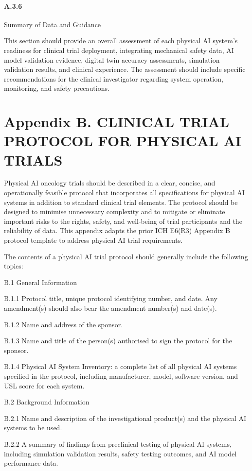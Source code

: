 \documentclass[11pt]{article}
\begin{document}
\paragraph{A.3.6} Summary of Data and Guidance

This section should provide an overall assessment of each physical AI system's readiness for clinical trial deployment, integrating mechanical safety data, AI model validation evidence, digital twin accuracy assessments, simulation validation results, and clinical experience. The assessment should include specific recommendations for the clinical investigator regarding system operation, monitoring, and safety precautions.

\section{Appendix B. CLINICAL TRIAL PROTOCOL FOR PHYSICAL AI TRIALS}

Physical AI oncology trials should be described in a clear, concise, and operationally feasible protocol that incorporates all specifications for physical AI systems in addition to standard clinical trial elements. The protocol should be designed to minimise unnecessary complexity and to mitigate or eliminate important risks to the rights, safety, and well-being of trial participants and the reliability of data. This appendix adapts the prior ICH E6(R3) Appendix B protocol template to address physical AI trial requirements.

The contents of a physical AI trial protocol should generally include the following topics:

B.1 General Information

B.1.1 Protocol title, unique protocol identifying number, and date. Any amendment(s) should also bear the amendment number(s) and date(s).

B.1.2 Name and address of the sponsor.

B.1.3 Name and title of the person(s) authorised to sign the protocol for the sponsor.

B.1.4 Physical AI System Inventory: a complete list of all physical AI systems specified in the protocol, including manufacturer, model, software version, and USL score for each system.

B.2 Background Information

B.2.1 Name and description of the investigational product(s) and the physical AI systems to be used.

B.2.2 A summary of findings from preclinical testing of physical AI systems, including simulation validation results, safety testing outcomes, and AI model performance data.
\end{document}
